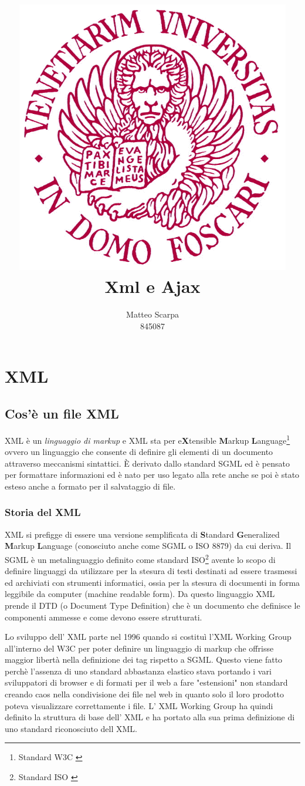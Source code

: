 \documentclass[a4paper,14pt]{article}
\title{\includegraphics[width=120mm]{logo-unive.png} \\ Xml e Ajax}
\author{Matteo Scarpa\\ 845087}
\date{}
\begin{document}
\maketitle
\newpage

\section{XML}
\subsection{Cos'è un file XML}
XML è un \textit{linguaggio di markup} e XML sta per e\textbf{X}tensible \textbf{M}arkup \textbf{L}anguage\footnote{Standard W3C \cite{site:w3cxml}} ovvero un linguaggio che consente di definire gli elementi di un documento attraverso meccanismi sintattici.
È derivato dallo standard SGML  ed è pensato per formattare informazioni ed è nato per uso legato alla rete anche se poi è stato esteso anche a formato per il salvataggio di file.

\subsubsection{Storia del XML}
XML si prefigge di essere una versione semplificata di \textbf{S}tandard \textbf{G}eneralized \textbf{M}arkup \textbf{L}anguage (conosciuto anche come SGML o ISO 8879) da cui deriva.
Il SGML è un metalinguaggio definito come standard ISO\footnote{Standard ISO \cite{site:isosgml}}  avente lo scopo di definire linguaggi da utilizzare per la stesura di testi destinati ad essere trasmessi ed archiviati con strumenti informatici, ossia per la stesura di documenti in forma leggibile da computer (machine readable form). Da questo linguaggio XML prende il DTD (o Document Type Definition) che è un documento che definisce le componenti ammesse e come devono essere strutturati.

Lo sviluppo dell' XML parte nel 1996 quando si costituì l’XML Working Group all'interno del W3C per poter definire un linguaggio di markup che offrisse maggior libertà nella definizione dei tag rispetto a SGML. Questo viene fatto perchè l'assenza di uno standard abbastanza elastico stava portando i vari sviluppatori di browser e di formati per il web a fare "estensioni" non standard creando caos nella condivisione dei file nel web in quanto solo il loro prodotto poteva visualizzare correttamente i file.
L' XML Working Group ha quindi definito la struttura di base dell' XML e ha portato alla sua prima definizione di uno standard riconosciuto dell XML. 
\end{document}

